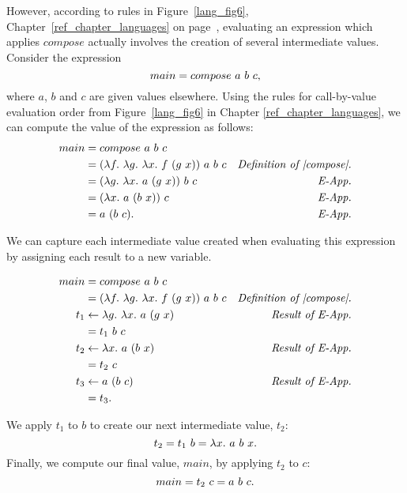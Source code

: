 \documentclass[12pt]{report}
\begin{document}
However, according to rules in Figure~\ref{lang_fig6},
Chapter~\ref{ref_chapter_languages} on page~\pageref{lang_fig6},
evaluating an expression which applies $compose$ actually involves the
creation of several intermediate values. Consider the expression
\begin{equation}
  main = compose\ a\ b\ c, \label{mil_eqn4}
\end{equation}
where $a$, $b$ and $c$ are given values elsewhere. Using the
rules for call-by-value evaluation order from Figure~\ref{lang_fig6} in 
Chapter \ref{ref_chapter_languages}, we can compute the value of the expression
as follows:
\begin{align*}
  main &= compose\ a\ b\ c \\
  &= (\lambda f.\ \lambda g.\ \lambda x.\ f\ (g\ x))\ a\ b\ c & \text{\emph{Definition of |compose|.}} \\
  &= (\lambda g.\ \lambda x.\ a\ (g\ x))\ b\ c & \text{\emph{E-App.}} \\
  &= (\lambda x.\ a\ (b\ x))\ c & \text{\emph{E-App.}} \\
  &= a\ (b\ c). & \text{\emph{E-App.}} 
\end{align*}

We can capture each intermediate value created when evaluating this
expression by assigning each result to a new variable. 

\begin{align*}
  main &= compose\ a\ b\ c \\
  &= (\lambda f.\ \lambda g.\ \lambda x.\ f\ (g\ x))\ a\ b\ c & \text{\emph{Definition of |compose|.}} \\
  t_1 &\leftarrow \lambda g.\ \lambda x.\ a\ (g\ x) & \text{\emph{Result of E-App.}}\\
  &= t_1\ b\ c \\
  t_2 &\leftarrow \lambda x.\ a\ (b\ x) & \text{\emph{Result of E-App.}} \\
  &= t_2\ c \\
  t_3 &\leftarrow a\ (b\ c) & \text{\emph{Result of E-App.}} \\
  &= t_3.
\end{align*}

We apply $t_1$ to $b$ to create our next intermediate value, $t_2$:
\begin{equation}
  t_2 = t_1\ b = \lambda x.\ a\ b\ x. \label{mil_eqn2}
\end{equation}
Finally, we compute our final value, $main$, by applying $t_2$ to $c$:
\begin{equation}
  main = t_2\ c = a\ b\ c. \label{mil_eqn3}  
\end{equation}
\end{document}
